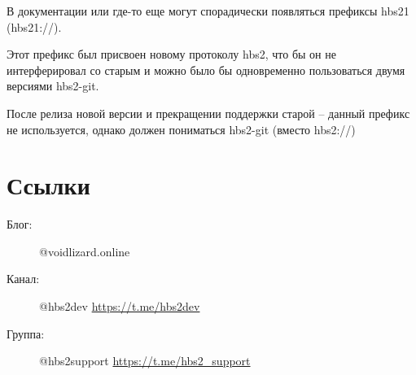 \documentclass[11pt,a4paper]{article}
\begin{document}
В документации или где-то еще могут спорадически появляться префиксы hbs21 (hbs21://).

Этот префикс был присвоен новому протоколу hbs2, что бы он не интерферировал
со старым и можно было бы одновременно пользоваться двумя версиями hbs2-git.

После релиза новой версии и прекращении поддержки старой -- данный префикс
не используется, однако должен пониматься hbs2-git (вместо hbs2://)

\section{Ссылки}

\begin{description}
  \item[Блог:] @voidlizard.online
  \item[Канал:]  @hbs2dev \url{https://t.me/hbs2dev}
  \item[Группа:] @hbs2support \url{https://t.me/hbs2_support}
\end{description}
\end{document}
